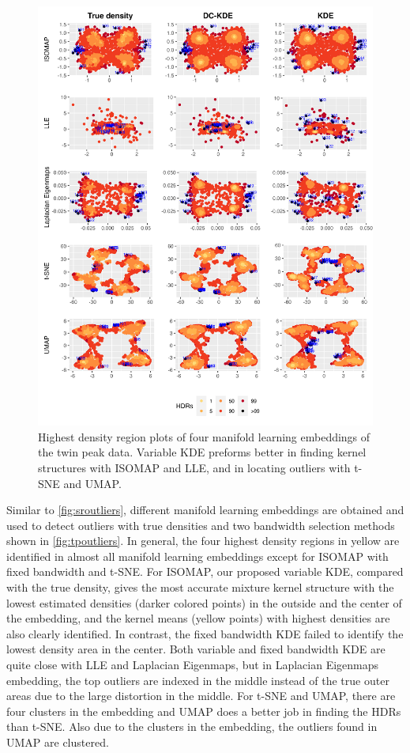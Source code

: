 \documentclass[11pt,a4paper,]{article}
\begin{document}
\begin{figure}

{\centering \includegraphics[width=0.95\linewidth]{figures/Twin Peak2000_5levels_outliers_comparison_5ml_r0_5} 

}

\caption{Highest density region plots of four manifold learning embeddings of the twin peak data. Variable KDE preforms better in finding kernel structures with ISOMAP and LLE, and in locating outliers with t-SNE and UMAP.}\label{fig:tpoutliers}
\end{figure}

Similar to \autoref{fig:sroutliers}, different manifold learning embeddings are obtained and used to detect outliers with true densities and two bandwidth selection methods shown in \autoref{fig:tpoutliers}.
In general, the four highest density regions in yellow are identified in almost all manifold learning embeddings except for ISOMAP with fixed bandwidth and t-SNE. For ISOMAP, our proposed variable KDE, compared with the true density, gives the most accurate mixture kernel structure with the lowest estimated densities (darker colored points) in the outside and the center of the embedding, and the kernel means (yellow points) with highest densities are also clearly identified. In contrast, the fixed bandwidth KDE failed to identify the lowest density area in the center. Both variable and fixed bandwidth KDE are quite close with LLE and Laplacian Eigenmaps, but in Laplacian Eigenmaps embedding, the top outliers are indexed in the middle instead of the true outer areas due to the large distortion in the middle. For t-SNE and UMAP, there are four clusters in the embedding and UMAP does a better job in finding the HDRs than t-SNE. Also due to the clusters in the embedding, the outliers
found in UMAP are clustered.
\end{document}
